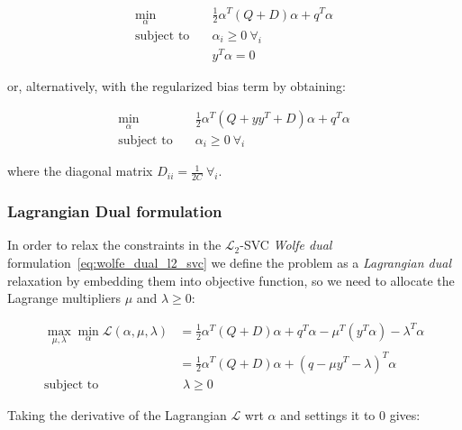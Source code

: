 \begin{equation} \label{eq:wolfe_dual_l2_svc}
    \begin{aligned}
        \min_{\alpha} \quad & \frac{1}{2}\alpha^T (Q + D)\alpha+q^T\alpha \\
            \text{subject to} \quad & \alpha_i\geq 0 \ \forall_i \\ & y^T\alpha=0
    \end{aligned}
\end{equation}

or, alternatively, with the regularized bias term by obtaining:

\begin{equation} \label{eq:reg_bias_wolfe_dual_l2_svc}
    \begin{aligned}
        \min_{\alpha} \quad & \frac{1}{2}\alpha^T (Q + yy^T + D) \alpha + q^T \alpha \\
            \text{subject to} \quad & \alpha_i \geq 0 \ \forall_i
    \end{aligned}
\end{equation}

where the diagonal matrix $\displaystyle D_{ii} = \frac{1}{2C} \ \forall_i$.

\subsubsection{Lagrangian Dual formulation}

In order to relax the constraints in the $\mathcal{L}_2$-SVC \emph{Wolfe dual} formulation~\eqref{eq:wolfe_dual_l2_svc} we define the problem as a \emph{Lagrangian dual} relaxation by embedding them into objective function, so we need to allocate the Lagrange multipliers $\mu$ and $\lambda \geq 0$:

\begin{equation} \label{eq:l2_svc_lagrangian_dual}
	\begin{aligned}
		    \max_{\mu,\lambda} \min_{\alpha} \mathcal{L}(\alpha,\mu,\lambda) &= \frac{1}{2} \alpha^T (Q+D)\alpha+q^T\alpha - \mu^T (y^T \alpha) - \lambda^T \alpha \\
    &= \frac{1}{2} \alpha^T (Q+D)\alpha + (q - \mu y^T - \lambda)^T \alpha \\
    \text{subject to} \quad & \,\, \lambda \geq 0
	\end{aligned}
\end{equation}

Taking the derivative of the Lagrangian $\mathcal{L}$ wrt $\alpha$ and settings it to 0 gives:

